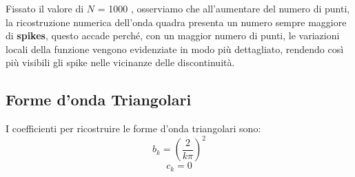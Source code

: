 \documentclass[10pt,a4paper]{article}
\begin{document}
Fissato il valore di \(N\) = 1000 , osserviamo che all'aumentare del numero di punti, la ricostruzione numerica dell'onda quadra presenta un numero sempre maggiore di  \textbf{spikes}, questo accade perché, con un maggior numero di punti, le variazioni locali della funzione vengono evidenziate in modo più dettagliato, rendendo così più visibili gli spike nelle vicinanze delle discontinuità.

\newpage
\subsection{Forme d'onda Triangolari}

I coefficienti per ricostruire le forme d'onda triangolari sono:
\begin{equation}
\label{eq4}
    b_k=(\frac{2}{k\pi})^2
\end{equation}
\begin{equation}
\label{eq5}
    c_k=0
\end{equation}
\vspace{-1cm}
\end{document}
